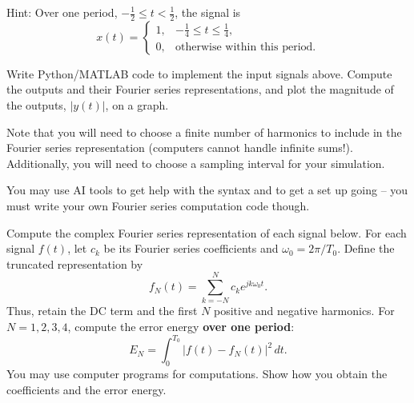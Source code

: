 \documentclass{ee102_pset}
\begin{document}
Hint: Over one period, $-\tfrac12\le t<\tfrac12$, the signal is
\[
x(t)=
\begin{cases}
1, & -\tfrac14\le t\le\tfrac14,\\
0, & \text{otherwise within this period.}
\end{cases}
\]




\problempart[20 points] Write Python/MATLAB code to implement the input
signals above. Compute the outputs and their Fourier series representations,
and plot the magnitude of the outputs, $|y(t)|$, on a graph.

Note that you will need to choose a finite number of harmonics to include in the Fourier series representation (computers cannot handle infinite sums!). Additionally, you will need to choose a sampling interval for your simulation.

You may use AI tools to get help with the syntax and to get a set up going -- you must write your own Fourier series computation code though.



Compute the complex Fourier series representation of each signal below.
For each signal $f(t)$, let $c_k$ be its Fourier series coefficients and
$\omega_0=2\pi/T_0$. Define the truncated representation by
\[
f_N(t)=\sum_{k=-N}^{N}c_k e^{jk\omega_0t}.
\]
Thus, retain the DC term and the first $N$ positive and negative harmonics.
For $N=1,2,3,4$, compute the error energy \textbf{over one period}:
\[
E_N=\int_0^{T_0}\left|f(t)-f_N(t)\right|^2\,dt.
\]
You may use computer programs for computations. Show how you obtain the
coefficients and the error energy.
\end{document}

